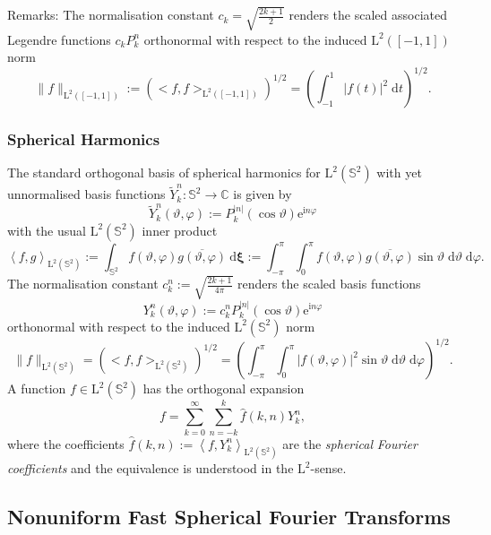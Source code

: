 \begin{Desc}
\item[Remarks:]The normalisation constant $ c_k = \sqrt{\frac{2k+1}{2}}$ renders the scaled associated Legendre functions $c_k P_k^n$ orthonormal with respect to the induced $\text{L}^2\left([-1,1]\right)$ norm \[ \|f\|_{\text{L}^2\left([-1,1]\right)} := \left(<f,f>_{\text{L}^2\left([-1,1]\right)}\right)^{1/2} = \left(\int_{-1}^{1} |f(t)|^2 \; \text{d} t\right)^{1/2}. \]\end{Desc}
\hypertarget{group__nfsft_sh}{}\subsubsection{Spherical Harmonics}\label{group__nfsft_sh}
The standard orthogonal basis of spherical harmonics for $\text{L}^2 \left(\mathbb{S}^2\right)$ with yet unnormalised basis functions $\tilde{Y}_k^n : \mathbb{S}^2 \rightarrow \mathbb{C}$ is given by \[ \tilde{Y}_k^n(\vartheta,\varphi) := P_k^{|n|}(\cos\vartheta) \mathrm{e}^{\mathrm{i} n \varphi} \] with the usual $\text{L}^2\left(\mathbb{S}^2\right)$ inner product \[ \left< f,g \right>_{\mathrm{L}^2\left(\mathbb{S}^2\right)} := \int_{\mathbb{S}^2} f(\vartheta,\varphi) \overline{g(\vartheta,\varphi)} \: \mathrm{d} \mathbf{\xi} := \int_{-\pi}^{\pi} \int_{0}^{\pi} f(\vartheta,\varphi) \overline{g(\vartheta,\varphi)} \sin \vartheta \; \mathrm{d} \vartheta \; \mathrm{d} \varphi. \] The normalisation constant $c_k^n := \sqrt{\frac{2k+1}{4\pi}}$ renders the scaled basis functions \[ Y_k^n(\vartheta,\varphi) := c_k^n P_k^{|n|}(\cos\vartheta) \mathrm{e}^{\mathrm{i} n \varphi} \] orthonormal with respect to the induced $\text{L}^2\left(\mathbb{S}^2 \right)$ norm \[ \|f\|_{\text{L}^2\left(\mathbb{S}^2\right)} = \left(<f,f>_{\text{L}^2\left(\mathbb{S}^2\right)}\right)^{1/2} = \left(\int_{-\pi}^{\pi} \int_{0}^{\pi} |f(\vartheta,\varphi)|^2 \sin \vartheta \; \mathrm{d} \vartheta \; \mathrm{d} \varphi\right)^{1/2}. \] A function $f \in \mathrm{L}^2\left(\mathbb{S}^2\right)$ has the orthogonal expansion \[ f = \sum_{k=0}^{\infty} \sum_{n=-k}^{k} \hat{f}(k,n) Y_k^n, \] where the coefficients $\hat{f}(k,n) := \left< f, Y_k^{n} \right>_{\mathrm{L}^2\left(\mathbb{S}^2\right)}$ are the {\em spherical\/} {\em Fourier\/} {\em coefficients\/} and the equivalence is understood in the $\mathrm{L}^2$-sense.\hypertarget{group__nfsft_nfsfts}{}\subsection{Nonuniform Fast Spherical Fourier Transforms}\label{group__nfsft_nfsfts}
